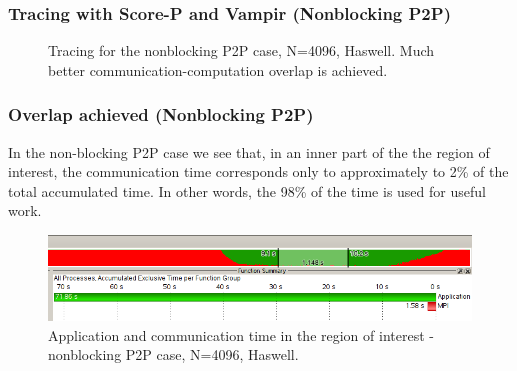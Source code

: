 \documentclass[10pt, compress]{beamer}
\begin{document}
\begin{frame}
  \frametitle{Tracing with Score-P and Vampir (Nonblocking P2P)}
  \begin{figure}
  \centering
  \caption{Tracing for the nonblocking P2P case, N=4096, Haswell. Much better communication-computation overlap is achieved.}
  \label{fig:vampir_nonblocking}
  \end{figure}
\end{frame}

\begin{frame}
  \frametitle{Overlap achieved (Nonblocking P2P)}
  In the non-blocking P2P case we see that, in an inner part of the the region of interest, the communication time corresponds only to approximately to 2\% of the total accumulated time. In other words, the 98\% of the time is used for useful work.
  \begin{figure}
  \centering
  \includegraphics[width=\textwidth]{images/overlap_nonblocking.png}
  \caption{Application and communication time in the region of interest - nonblocking P2P case, N=4096, Haswell.}
  \label{fig:overlap_nonblocking}
  \end{figure}
\end{frame}
\end{document}
